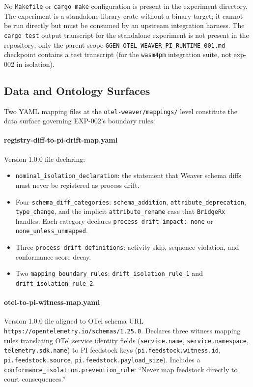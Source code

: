 No \texttt{Makefile} or \texttt{cargo make} configuration is present in the
experiment directory. The experiment is a standalone library crate without a
binary target; it cannot be run directly but must be consumed by an upstream
integration harness. The \texttt{cargo test} output transcript for the standalone
experiment is not present in the repository; only the parent-scope
\texttt{GGEN\_OTEL\_WEAVER\_PI\_RUNTIME\_001.md} checkpoint contains a test
transcript (for the \texttt{wasm4pm} integration suite, not exp-002 in isolation).

\subsection{Data and Ontology Surfaces}
\label{sec:otel-weaver-exp-002-diff-to-residual-impl-data}

Two YAML mapping files at the \texttt{otel-weaver/mappings/} level constitute the
data surface governing EXP-002's boundary rules:

\paragraph{registry-diff-to-pi-drift-map.yaml}
Version 1.0.0 file declaring:
\begin{itemize}
    \item \texttt{nominal\_isolation\_declaration}: the statement that Weaver schema
          diffs must never be registered as process drift.
    \item Four \texttt{schema\_diff\_categories}: \texttt{schema\_addition},
          \texttt{attribute\_deprecation}, \texttt{type\_change}, and the implicit
          \texttt{attribute\_rename} case that \texttt{BridgeRx} handles. Each
          category declares \texttt{process\_drift\_impact: none} or
          \texttt{none\_unless\_unmapped}.
    \item Three \texttt{process\_drift\_definitions}: activity skip, sequence
          violation, and conformance score decay.
    \item Two \texttt{mapping\_boundary\_rules}: \texttt{drift\_isolation\_rule\_1}
          and \texttt{drift\_isolation\_rule\_2}.
\end{itemize}

\paragraph{otel-to-pi-witness-map.yaml}
Version 1.0.0 file aligned to OTel schema URL
\texttt{https://opentelemetry.io/schemas/1.25.0}. Declares three witness mapping
rules translating OTel service identity fields (\texttt{service.name},
\texttt{service.namespace}, \texttt{telemetry.sdk.name}) to PI feedstock keys
(\texttt{pi.feedstock.witness.id}, \texttt{pi.feedstock.source},
\texttt{pi.feedstock.payload\_size}). Includes a
\texttt{conformance\_isolation.prevention\_rule}: ``Never map feedstock directly
to court consequences.''

